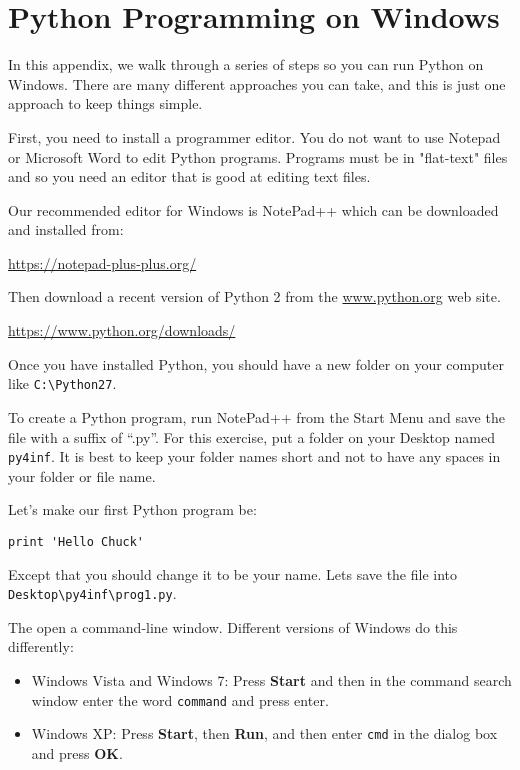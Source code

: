 
\chapter{Python Programming on Windows}

In this appendix, we walk through a series of steps
so you can run Python on Windows.  There are many different 
approaches you can take, and this is just one
approach to keep things simple.

First, you need to install a programmer editor.  You
do not want to use Notepad or Microsoft Word to edit
Python programs.  Programs must be in "flat-text" files
and so you need an editor that is good at
editing text files.

Our recommended editor for Windows is NotePad++ which
can be downloaded and installed from:

\url{https://notepad-plus-plus.org/}

Then download a recent version of Python 2 from the
\url{www.python.org} web site.

\url{https://www.python.org/downloads/}

Once you have installed Python, you should have a new
folder on your computer like {\tt C:{\textbackslash}Python27}.

To create a Python program, run NotePad++ from the Start Menu
and save the file with a suffix of ``.py''.  For this
exercise, put a folder on your Desktop named 
{\tt py4inf}.  It is best to keep your folder names short
and not to have any spaces in your folder or file name.

Let's make our first Python program be:

\beforeverb
\begin{verbatim}
print 'Hello Chuck'
\end{verbatim}
\afterverb
%
Except that you should change it to be your name.  Lets
save the file into {\tt Desktop{\textbackslash}py4inf{\textbackslash}prog1.py}.

The open a command-line window.  Different versions of Windows
do this differently:

\begin{itemize}
\item Windows Vista and Windows 7: Press {\bf Start}
and then in the command search window enter the word
{\tt command} and press enter.

\item Windows XP: Press {\bf Start}, then {\bf Run}, and 
then enter {\tt cmd} in the dialog box and press {\bf OK}.
\end{itemize}

